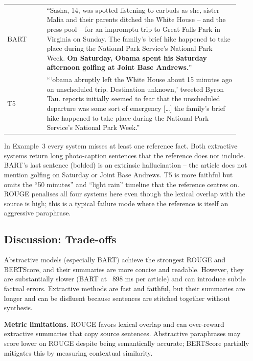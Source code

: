 \begin{table}[H]
\begin{tabular}{p{0.16\linewidth} p{0.78\linewidth}}
BART & ``Sasha, 14, was spotted listening to earbuds as she, sister Malia and their parents ditched the White House -- and the press pool -- for an impromptu trip to Great Falls Park in Virginia on Sunday. The family's brief hike happened to take place during the National Park Service's National Park Week. \textbf{On Saturday, Obama spent his Saturday afternoon golfing at Joint Base Andrews.}'' \\
T5 & ```obama abruptly left the White House about 15 minutes ago on unscheduled trip. Destination unknown,' tweeted Byron Tau. reports initially seemed to fear that the unscheduled departure was some sort of emergency [\dots] the family's brief hike happened to take place during the National Park Service's National Park Week.'' \\
\bottomrule
\end{tabular}
\end{table}

In Example~3 every system misses at least one reference fact. Both extractive systems return long photo-caption sentences that the reference does not include. BART's last sentence (bolded) is an extrinsic hallucination -- the article does not mention golfing on Saturday or Joint Base Andrews. T5 is more faithful but omits the ``50 minutes'' and ``light rain'' timeline that the reference centres on. ROUGE penalises all four systems here even though the lexical overlap with the source is high; this is a typical failure mode where the reference is itself an aggressive paraphrase.

\subsection{Discussion: Trade-offs}
Abstractive models (especially BART) achieve the strongest ROUGE and BERTScore, and their summaries are more concise and readable. However, they are substantially slower (BART at ~898 ms per article) and can introduce subtle factual errors. Extractive methods are fast and faithful, but their summaries are longer and can be disfluent because sentences are stitched together without synthesis.

\textbf{Metric limitations.} ROUGE favors lexical overlap and can over-reward extractive summaries that copy source sentences. Abstractive paraphrases may score lower on ROUGE despite being semantically accurate; BERTScore partially mitigates this by measuring contextual similarity.
